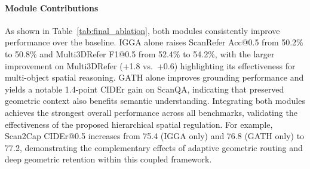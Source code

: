 \documentclass[lettersize,journal]{IEEEtran}
\begin{document}
\begin{table}[htbp]
\centering
\footnotesize  
\setlength{\tabcolsep}{2.8pt}
\caption{\textbf{Ablation Study on Feature Extraction Layers for GATH.}}
\label{tab:layers_ablation}
\end{table}

\paragraph*{Module Contributions} As shown in Table~\ref{tab:final_ablation}, both modules consistently improve performance over the baseline. IGGA alone raises ScanRefer Acc@0.5 from 50.2\% to 50.8\% and Multi3DRefer F1@0.5 from 52.4\% to 54.2\%, with the larger improvement on Multi3DRefer (+1.8 vs.\ +0.6) highlighting its effectiveness for multi-object spatial reasoning. GATH alone improves grounding performance and yields a notable 1.4-point CIDEr gain on ScanQA, indicating that preserved geometric context also benefits semantic understanding. Integrating both modules achieves the strongest overall performance across all benchmarks, validating the effectiveness of the proposed hierarchical spatial regulation. For example, Scan2Cap CIDEr@0.5 increases from 75.4 (IGGA only) and 76.8 (GATH only) to 77.2, demonstrating the complementary effects of adaptive geometric routing and deep geometric retention within this coupled framework.
\end{document}

